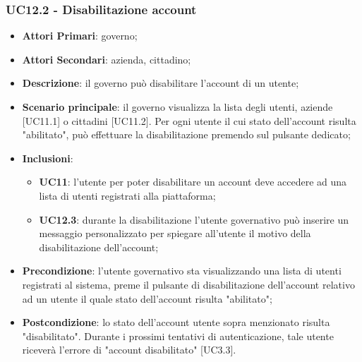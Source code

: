 \subsubsection{UC12.2 - Disabilitazione account}
\begin{itemize}
	\item \textbf{Attori Primari}:
	governo;
	\item \textbf{Attori Secondari}:
	azienda, cittadino;
	\item \textbf{Descrizione}: il governo può disabilitare l'account di un utente;
	\item \textbf{Scenario principale}: il governo visualizza la lista degli utenti, aziende [UC11.1] o cittadini [UC11.2]. Per ogni utente il cui stato dell'account risulta "abilitato", può effettuare la disabilitazione premendo sul pulsante dedicato;
	\item \textbf{Inclusioni}: 
	\begin{itemize}
		\item \textbf{UC11}: l'utente per poter disabilitare un account deve accedere ad una lista di utenti registrati alla piattaforma;
		\item \textbf{UC12.3}: durante la disabilitazione l'utente governativo può inserire un messaggio personalizzato per spiegare all'utente il motivo della disabilitazione dell'account;
	\end{itemize}
	\item \textbf{Precondizione}: l'utente governativo sta visualizzando una lista di utenti registrati al sistema, preme il pulsante di disabilitazione dell'account relativo ad un utente il quale stato dell'account risulta "abilitato";
	\item \textbf{Postcondizione}: lo stato  dell'account utente sopra menzionato risulta "disabilitato". Durante i prossimi tentativi di autenticazione, tale utente riceverà l'errore di "account disabilitato" [UC3.3].
\end{itemize} 

